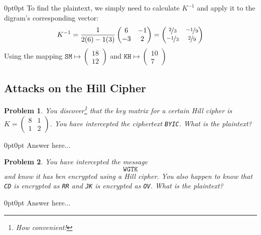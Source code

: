 \documentclass[12pt]{article}
\newenvironment{answer}
    {\begin{adjustwidth}{0pt}{0pt}}
    {\end{adjustwidth}}
\newtheorem{problem}{Problem}
\theoremstyle{remark}  %
\begin{document}
    \begin{answer}
        To find the plaintext, we simply need to calculate $K^{-1}$ and apply it to the digram's corresponding vector: $$
            K^{-1} = \frac{1}{2(6)-1(3)}\begin{pmatrix}
                6 & -1 \\
                -3 & 2
            \end{pmatrix} = \begin{pmatrix}
                \nicefrac{2}{3} & \nicefrac{-1}{9} \\
                \nicefrac{-1}{3} & \nicefrac{2}{9}
            \end{pmatrix}
        $$ Using the mapping $\texttt{SM}\mapsto \begin{pmatrix}
            18 \\
            12
        \end{pmatrix}$ and $\texttt{KH}\mapsto \begin{pmatrix}
            10 \\
            7
        \end{pmatrix}$
    \end{answer}

\subsection{Attacks on the Hill Cipher}
\setcounter{problem}{0}
    \begin{problem}
        You discover\footnote{How convenient!} that the key matrix for a certain Hill cipher is $K=\begin{pmatrix}
            8 & 1 \\
            1 & 2
        \end{pmatrix}$. You have intercepted the ciphertext \texttt{BYIC}. What is the plaintext?
    \end{problem}
    \begin{answer}
        Answer here...
    \end{answer}
\vspace{5pt}
    \begin{problem}
        You have intercepted the message $$\texttt{WGTK}$$ and know it has ben encrypted using a Hill cipher. You also happen to know that \texttt{CD} is encrypted as \texttt{RR} and \texttt{JK} is encrypted as \texttt{OV}. What is the plaintext? 
    \end{problem}
    \begin{answer}
        Answer here...
    \end{answer}
\end{document}
